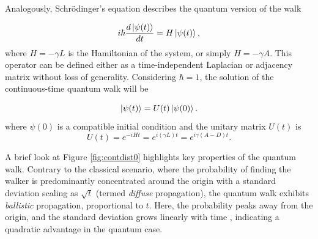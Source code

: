 \documentclass[main.tex]{subfiles}
\begin{document}
Analogously, Schrödinger's equation describes the quantum version of the walk 

\begin{equation}
	i\hbar \frac{d\ket{\psi(t)}}{dt} = H \ket{\psi(t)}, \label{shrodinger}
\end{equation}
where $H = -\gamma L$ is the Hamiltonian of the system, or simply $H = -\gamma
A$. This operator can be defined either as a time-independent Laplacian or
adjacency matrix without loss of generality. Considering $\hbar = 1$, the
solution of the continuous-time quantum walk will be 

\begin{equation}
	\ket{\psi(t)} = U(t)\ket{\psi(0)}.
    \label{eq:ctqwSystemEvolution}
\end{equation}
where $\psi(0)$ is a compatible initial condition and the unitary matrix $U(t)$
is
\begin{equation}
	U(t) = e^{-iHt} = e^{i(\gamma L)t} = e^{i\gamma(A-D)t}.
    \label{eq:contSimulUniOp}
\end{equation}

A brief look at Figure \ref{fig:contdist0} highlights key properties of the
quantum walk. Contrary to the classical scenario, where the probability of
finding the walker is predominantly concentrated around the origin with a
standard deviation scaling as $\sqrt{t}$ (termed \textit{diffuse} propagation),
the quantum walk exhibits \textit{ballistic} propagation, proportional to $t$. Here, the probability
peaks away from the origin, and the standard deviation grows linearly with time
\cite{childs2002}, indicating a quadratic advantage in the quantum case.
\end{document}
